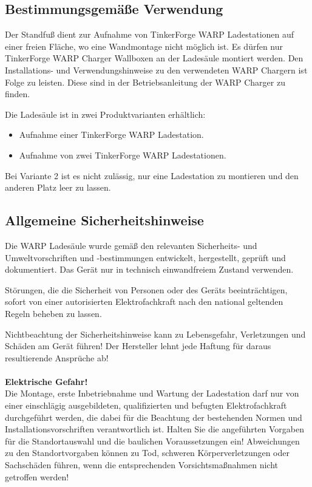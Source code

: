 \documentclass[a4paper,10pt]{article}
\newcommand{\warn}[1]{\begin{tcolorbox}[colback=boxred,colframe=red,coltext=
white,title=Warnung]#1\end{tcolorbox}}
\begin{document}
\begin{multicols*}{2}
	\subsection{Bestimmungsgemäße Verwendung}
	Der Standfuß dient zur Aufnahme von TinkerForge WARP Ladestationen auf einer freien Fläche, wo eine 
	Wandmontage nicht möglich ist. Es dürfen nur TinkerForge WARP Charger
	Wallboxen an der Ladesäule montiert werden. Den Installations- und
	Verwendungshinweise zu den verwendeten WARP Chargern ist Folge zu leisten.
	Diese sind in der Betriebsanleitung der WARP Charger zu finden.

	Die Ladesäule ist in zwei Produktvarianten erhältlich:
	\begin{itemize}
		\item Aufnahme einer TinkerForge WARP Ladestation.
		\item Aufnahme von zwei TinkerForge WARP Ladestationen.
	\end{itemize}
	
	Bei Variante 2 ist es nicht zulässig, nur eine Ladestation zu montieren und den anderen Platz leer zu lassen.

	\subsection{Allgemeine Sicherheitshinweise}

	Die WARP Ladesäule wurde gemäß den relevanten Sicherheits- und Umweltvorschriften und -bestimmungen 
	entwickelt, hergestellt, geprüft und dokumentiert. Das Gerät nur in technisch einwandfreiem Zustand verwenden.

	Störungen, die die Sicherheit von Personen oder des Geräts beeinträchtigen, 
	sofort von einer autorisierten Elektrofachkraft nach den national geltenden Regeln beheben zu lassen.

	\warn{Nichtbeachtung der Sicherheitshinweise kann zu Lebensgefahr,
	Verletzungen und Schäden am Gerät führen! Der Hersteller lehnt jede Haftung
	für daraus resultierende Ansprüche ab!
	\\
	\\
	\textbf{Elektrische Gefahr!}\\
	Die Montage, erste Inbetriebnahme und Wartung der Ladestation darf nur von einer einschlägig ausgebildeten, qualifizierten und befugten Elektrofachkraft durchgeführt werden, die dabei für die Beachtung der bestehenden Normen und Installationsvorschriften verantwortlich ist. Halten Sie die angeführten Vorgaben für die Standortauswahl und die baulichen Voraussetzungen ein! Abweichungen zu den Standortvorgaben können zu Tod, schweren Körperverletzungen oder Sachschäden führen, wenn die entsprechenden Vorsichtsmaßnahmen nicht getroffen werden!
	}


\end{multicols*}
\end{document}
